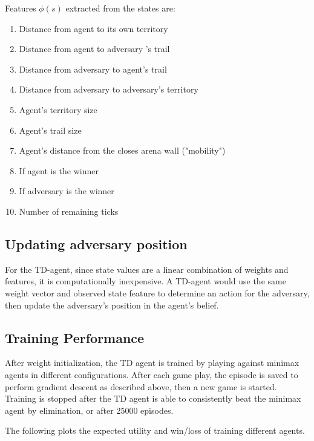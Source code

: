 \documentclass{article}
\begin{document}
Features $\phi(s)$ extracted from the states are:

\begin{enumerate}
    \item Distance from agent to its own territory
    \item Distance from agent to adversary
    's trail
    \item Distance from adversary to agent's trail
    \item Distance from adversary to adversary's territory
    \item Agent's territory size
    \item Agent's trail size
    \item Agent's distance from the closes arena wall ("mobility")
    \item If agent is the winner 
    \item If adversary is the winner
    \item Number of remaining ticks
\end{enumerate}

\subsection{Updating adversary position}

For the TD-agent, since state values are a linear combination of weights and features, it is computationally inexpensive. A TD-agent would use the same weight vector and observed state feature to determine an action for the adversary, then update the adversary's position in the agent's belief.

\subsection{Training Performance}

After weight initialization, the TD agent is trained by playing against minimax agents in different configurations. After each game play, the episode is saved to perform gradient descent as described above, then a new game is started. Training is stopped after the TD agent is able to consistently beat the minimax agent by elimination, or after 25000 episodes.

The following plots the expected utility and win/loss of training different agents.
\end{document}
